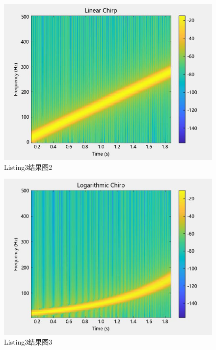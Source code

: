 \documentclass{article}
\begin{document}
		\begin{figure}[htbp]
		\centering
		\includegraphics{hw5(3)-2.jpeg}
		\caption{Listing3结果图2}
		\label{fig3-2}
	\end{figure}
		\begin{figure}[htbp]
		\centering
		\includegraphics{hw5(3)-3.jpeg}
		\caption{Listing3结果图3}
		\label{fig3-3}
	\end{figure}
	
\end{document}

